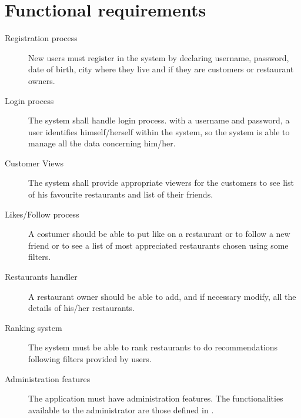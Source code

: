\section{Functional requirements}\label{sec:functionalrequirements}

\begin{description}
    \item [Registration process] New users must register in the system by declaring username, password, date of birth, city where they live and if they are customers or restaurant owners.
    \item [Login process] The system shall handle login process. with a username and password, a user identifies himself/herself within the system, so the system is
    able to manage all the data concerning him/her.
    \item [Customer Views] The system shall provide appropriate viewers for the customers to see list of his favourite restaurants and list of their friends.
    \item [Likes/Follow process] A costumer should be able to put like on a restaurant or to follow a new friend or to see a list of most appreciated restaurants chosen using some filters.
    \item [Restaurants handler] A restaurant owner should be able to add, and if necessary modify, all the details of his/her restaurants.
    \item [Ranking system] The system must be able to rank restaurants to do recommendations following filters provided by users.
    \item[Administration features] The application must have
		administration features. The functionalities available to the
		administrator are those defined in .
\end{description}

